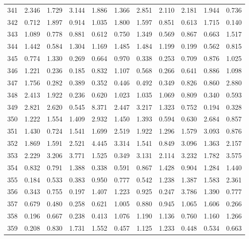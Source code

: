 \begin{tabular}{lrrrrrrrrrr}
341 &  2.346 &  1.729 &  3.144 &  1.886 &  1.366 &  2.851 &  2.110 &  2.181 &  1.944 &  0.736 \\
342 &  0.712 &  1.897 &  0.914 &  1.035 &  1.800 &  1.597 &  0.851 &  0.613 &  1.715 &  0.140 \\
343 &  1.089 &  0.778 &  0.881 &  0.612 &  0.750 &  1.349 &  0.569 &  0.867 &  0.663 &  1.517 \\
344 &  1.442 &  0.584 &  1.304 &  1.169 &  1.485 &  1.484 &  1.199 &  0.199 &  0.562 &  0.815 \\
345 &  0.774 &  1.330 &  0.269 &  0.664 &  0.970 &  0.338 &  0.253 &  0.709 &  0.876 &  1.025 \\
346 &  1.221 &  0.236 &  0.185 &  0.832 &  1.107 &  0.568 &  0.266 &  0.641 &  0.886 &  1.098 \\
347 &  1.756 &  0.282 &  0.389 &  0.352 &  0.446 &  0.492 &  0.349 &  0.826 &  0.860 &  2.880 \\
348 &  2.413 &  1.922 &  0.236 &  0.620 &  1.023 &  1.035 &  1.069 &  0.809 &  0.340 &  0.593 \\
349 &  2.821 &  2.620 &  0.545 &  8.371 &  2.447 &  3.217 &  1.323 &  0.752 &  0.194 &  0.328 \\
350 &  1.222 &  1.554 &  1.409 &  2.932 &  1.450 &  1.393 &  0.594 &  0.630 &  2.684 &  0.857 \\
351 &  1.430 &  0.724 &  1.541 &  1.699 &  2.519 &  1.922 &  1.296 &  1.579 &  3.093 &  0.876 \\
352 &  1.869 &  1.591 &  2.521 &  4.445 &  3.314 &  1.541 &  0.849 &  3.096 &  1.363 &  2.157 \\
353 &  2.229 &  3.206 &  3.771 &  1.525 &  0.349 &  3.131 &  2.114 &  3.232 &  1.782 &  3.575 \\
354 &  0.832 &  0.791 &  1.388 &  0.338 &  0.591 &  0.867 &  1.428 &  0.904 &  1.284 &  1.440 \\
355 &  0.184 &  0.533 &  0.383 &  0.950 &  0.777 &  0.542 &  1.238 &  1.387 &  1.583 &  2.361 \\
356 &  0.343 &  0.755 &  0.197 &  1.407 &  1.223 &  0.925 &  0.247 &  3.786 &  1.390 &  0.777 \\
357 &  0.679 &  0.480 &  0.258 &  0.621 &  1.005 &  0.880 &  0.945 &  1.065 &  1.606 &  0.266 \\
358 &  0.196 &  0.667 &  0.238 &  0.413 &  1.076 &  1.190 &  1.136 &  0.760 &  1.160 &  1.266 \\
359 &  0.208 &  0.830 &  1.731 &  1.552 &  0.457 &  1.125 &  1.233 &  0.448 &  0.534 &  0.663 \\

\end{tabular}
